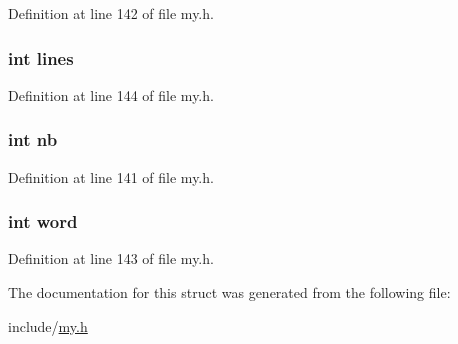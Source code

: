 Definition at line 142 of file my.\+h.

\hypertarget{structs__win_a9921ae02cadccc99dd6c3a9b68be050a}{
\subsubsection[{lines}]{\setlength{\rightskip}{0pt plus 5cm}int lines}}\label{structs__win_a9921ae02cadccc99dd6c3a9b68be050a}


Definition at line 144 of file my.\+h.

\hypertarget{structs__win_ab310c6afcc676eab3930dce2650511c0}{
\subsubsection[{nb}]{\setlength{\rightskip}{0pt plus 5cm}int nb}}\label{structs__win_ab310c6afcc676eab3930dce2650511c0}


Definition at line 141 of file my.\+h.

\hypertarget{structs__win_a32e8aeb1c57991c216eeb16a1599d816}{
\subsubsection[{word}]{\setlength{\rightskip}{0pt plus 5cm}int word}}\label{structs__win_a32e8aeb1c57991c216eeb16a1599d816}


Definition at line 143 of file my.\+h.



The documentation for this struct was generated from the following file\+:\begin{DoxyCompactItemize}
\item 
include/\hyperlink{my_8h}{my.\+h}\end{DoxyCompactItemize}
